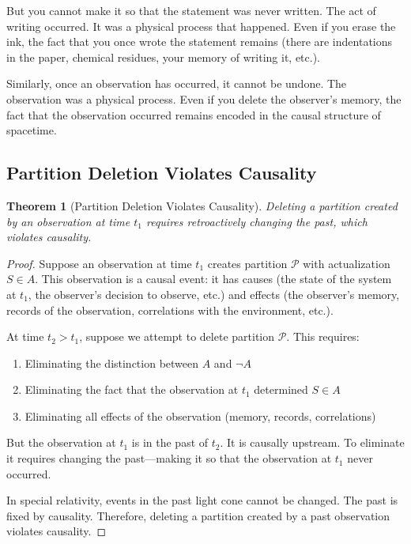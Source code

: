 \documentclass[twocolumn,10pt]{article}
\newtheorem{theorem}{Theorem}[section]
\theoremstyle{definition}
\theoremstyle{remark}
\begin{document}
But you cannot make it so that the statement was never written. The act of writing occurred. It was a physical process that happened. Even if you erase the ink, the fact that you once wrote the statement remains (there are indentations in the paper, chemical residues, your memory of writing it, etc.).

\vspace{0.2cm}
\noindent Similarly, once an observation has occurred, it cannot be undone. The observation was a physical process. Even if you delete the observer's memory, the fact that the observation occurred remains encoded in the causal structure of spacetime.

\subsection{Partition Deletion Violates Causality}

\begin{theorem}[Partition Deletion Violates Causality]
\label{thm:deletion_violates_causality}
Deleting a partition created by an observation at time $t_1$ requires retroactively changing the past, which violates causality.
\end{theorem}

\begin{proof}
Suppose an observation at time $t_1$ creates partition $\mathcal{P}$ with actualization $S \in A$. This observation is a causal event: it has causes (the state of the system at $t_1$, the observer's decision to observe, etc.) and effects (the observer's memory, records of the observation, correlations with the environment, etc.).

At time $t_2 > t_1$, suppose we attempt to delete partition $\mathcal{P}$. This requires:
\begin{enumerate}
\item Eliminating the distinction between $A$ and $\neg A$
\item Eliminating the fact that the observation at $t_1$ determined $S \in A$
\item Eliminating all effects of the observation (memory, records, correlations)
\end{enumerate}

But the observation at $t_1$ is in the past of $t_2$. It is causally upstream. To eliminate it requires changing the past—making it so that the observation at $t_1$ never occurred.

\vspace{0.2cm}
\noindent In special relativity, events in the past light cone cannot be changed. The past is fixed by causality. Therefore, deleting a partition created by a past observation violates causality.
\end{proof}
\end{document}

